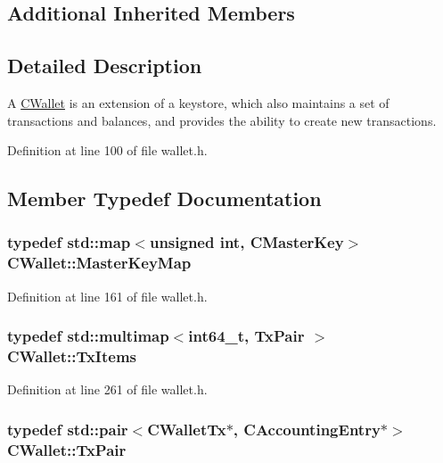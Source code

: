 \subsection*{Additional Inherited Members}


\subsection{Detailed Description}
A \hyperlink{class_c_wallet}{C\+Wallet} is an extension of a keystore, which also maintains a set of transactions and balances, and provides the ability to create new transactions. 

Definition at line 100 of file wallet.\+h.



\subsection{Member Typedef Documentation}
\hypertarget{class_c_wallet_a0e21167a320a0ab8f15d0e11c6749a0e}{}
\subsubsection[{Master\+Key\+Map}]{\setlength{\rightskip}{0pt plus 5cm}typedef std\+::map$<$unsigned int, {\bf C\+Master\+Key}$>$ {\bf C\+Wallet\+::\+Master\+Key\+Map}}\label{class_c_wallet_a0e21167a320a0ab8f15d0e11c6749a0e}


Definition at line 161 of file wallet.\+h.

\hypertarget{class_c_wallet_ac35fb148c0967ad24db292435b54ad85}{}
\subsubsection[{Tx\+Items}]{\setlength{\rightskip}{0pt plus 5cm}typedef std\+::multimap$<${\bf int64\+\_\+t}, {\bf Tx\+Pair} $>$ {\bf C\+Wallet\+::\+Tx\+Items}}\label{class_c_wallet_ac35fb148c0967ad24db292435b54ad85}


Definition at line 261 of file wallet.\+h.

\hypertarget{class_c_wallet_ad1557a7d200f70bc97319376a24c98a7}{}
\subsubsection[{Tx\+Pair}]{\setlength{\rightskip}{0pt plus 5cm}typedef std\+::pair$<${\bf C\+Wallet\+Tx}$\ast$, {\bf C\+Accounting\+Entry}$\ast$$>$ {\bf C\+Wallet\+::\+Tx\+Pair}}\label{class_c_wallet_ad1557a7d200f70bc97319376a24c98a7}


